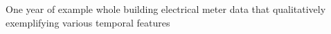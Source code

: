 One year of example whole building electrical meter data that qualitatively exemplifying various temporal features
\label{fig:electricalmeters_oneyear}
